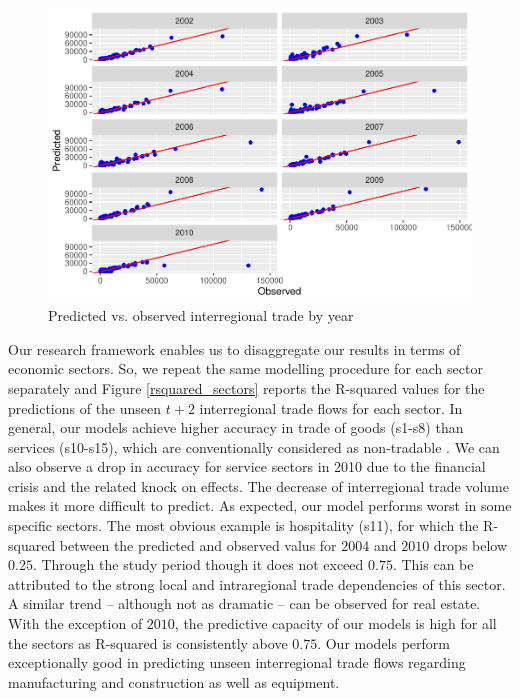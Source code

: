 \documentclass[]{interact}
\theoremstyle{plain}%
\theoremstyle{definition}
\theoremstyle{remark}
\begin{document}
\begin{figure}[p]
\includegraphics[width=1\linewidth]{hl_files/figure-latex/unnamed-chunk-7-1} \caption{\label{prediction}Predicted vs. observed interregional trade by year}\label{fig:unnamed-chunk-7}
\end{figure}

Our research framework enables us to disaggregate our results in terms
of economic sectors. So, we repeat the same modelling procedure for each
sector separately and Figure \ref{rsquared_sectors} reports the
R-squared values for the predictions of the unseen \(t + 2\)
interregional trade flows for each sector. In general, our models
achieve higher accuracy in trade of goods (s1-s8) than services
(s10-s15), which are conventionally considered as non-tradable
\citep{jensen2005}. We can also observe a drop in accuracy for service
sectors in 2010 due to the financial crisis and the related knock on
effects. The decrease of interregional trade volume makes it more
difficult to predict. As expected, our model performs worst in some
specific sectors. The most obvious example is hospitality (s11), for
which the R-squared between the predicted and observed valus for
\(2004\) and \(2010\) drops below \(0.25\). Through the study period
though it does not exceed \(0.75\). This can be attributed to the strong
local and intraregional trade dependencies of this sector. A similar
trend -- although not as dramatic -- can be observed for real estate.
With the exception of \(2010\), the predictive capacity of our models is
high for all the sectors as R-squared is consistently above \(0.75\).
Our models perform exceptionally good in predicting unseen interregional
trade flows regarding manufacturing and construction as well as
equipment.
\end{document}
